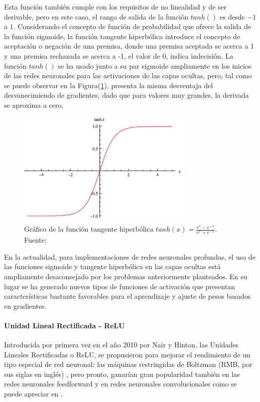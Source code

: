             Esta función también cumple con los requisitos de no linealidad y de ser derivable, pero en este caso, el rango de 
            salida de la función $tanh()$ es desde $-1$ a $1$. Considerando el concepto de función de probabilidad que ofrece 
            la salida de la función sigmoide, la función tangente hiperbólica introduce el concepto de aceptación o negación 
            de una premisa, donde una premisa aceptada se acerca a 1 y una premisa rechazada se acerca a -1, el valor de 0, 
            indica indecisión. La función $tanh()$ se ha usado junto a su par sigmoide ampliamente en los inicios de las redes 
            neuronales para las activaciones de las capas ocultas, pero, tal como se puede observar en la Figura(\ref{fig:tanh}), 
            presenta la misma desventaja del desvanecimiendo de gradientes, dado que para valores muy grandes, la derivada se 
            aproxima a cero.

            \begin{figure}[!h] 
                \centering
                \includegraphics[width=0.75\textwidth]{img/tanh}
                \caption[Gráfico de la función tangente hiperbólica]{Gráfico de la función tangente hiperbólica $tanh(x) = \frac{e^x - e^{-x}}{e^x + e^{-x}}$. Fuente: \cite{wang_2016} }
                \label{fig:tanh}
            \end{figure}

            En la actualidad, para implementaciones de redes neuronales profundas, el uso de las funciones sigmoide y tangente 
            hiperbólica en las capas ocultas está ampliamente desaconsejado por los problemas anteriormente planteados. En su 
            lugar se ha generado nuevos tipos de funciones de activación que presentan características bastante favorables 
            para el aprendizaje y ajuste de pesos basados en gradientes.

            \paragraph{Unidad Lineal Rectificada - ReLU}\label{sec:relu}
            Introducida por primera vez en el año 2010 por Nair y Hinton, las Unidades Lineales Rectificadas o ReLU, se 
            propusieron para mejorar el rendimiento de un tipo especial de red neuronal: las máquinas restringidas de Boltzman 
            (RMB, por sus siglas en inglés) \cite{nair2010rectified}, pero pronto, ganarían gran popularidad también en las 
            redes neuronales feedforward y en redes neuronales convolucionales como se puede apreciar en \cite{krizhevsky2012imagenet}.
            
